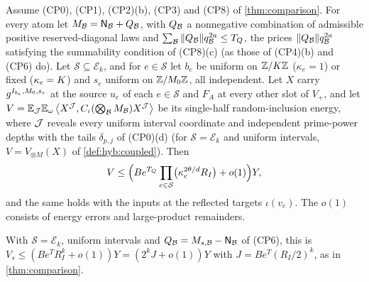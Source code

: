 \begin{lemma}\label{lem:envelope-energy}
Assume (CP0), (CP1), (CP2)(b), (CP3) and (CP8) of \cref{thm:comparison}. For
every atom let $M_\mathcal B=\mathsf N_\mathcal B+Q_\mathcal B$, with $Q_\mathcal B$ a nonnegative combination
of admissible positive reserved-diagonal laws and
$\sum_\mathcal B\|Q_\mathcal B\|q_\mathcal B^{2a}\le T_Q$, the prices $\|Q_\mathcal B\|q_\mathcal B^{2a}$
satisfying the summability condition of (CP8)(c) (as those of (CP4)(b) and
(CP6) do). Let $\mathcal S\subseteq\mathcal E_k$, and
for $e\in\mathcal S$ let $b_e$ be uniform on $\mathbb Z/K\mathbb Z$ ($\kappa_e=1$) or
fixed ($\kappa_e=K$) and $s_e$ uniform on $\mathbb Z/M_0\mathbb Z$, all independent.
Let $X$ carry $g^{I_{b_e},M_0,s_e}$ at the source $u_e$ of each
$e\in\mathcal S$ and $F_A$ at every other slot of $V_+$, and let
$V=\mathbb E_\mathcal J\mathbb E_\omega\left\langle X^\mathcal J,C_\iota(\bigotimes_\mathcal B M_\mathcal B)X^\mathcal J\right\rangle$ be its
single-half random-inclusion energy, where $\mathcal J$ reveals every uniform
interval coordinate and independent prime-power depths with the tails
$\delta_{p,j}$ of (CP0)(d) (for $\mathcal
S=\mathcal E_k$ and uniform intervals, $V=V_{\otimes M}(X)$ of
\cref{def:hyb:coupled}). Then
\[
 V\le\Bigl(Be^{T_Q}\prod_{e\in\mathcal S}\bigl(\kappa_e^{2\theta/d}R_I\bigr)
 +o(1)\Bigr)Y ,
\]
and the same holds with the inputs at the reflected targets $\iota(v_e)$. The
$o(1)$ consists of energy errors and large-product remainders.
\end{lemma}

With $\mathcal S=\mathcal E_k$, uniform intervals and $Q_\mathcal B=M_{s,\mathcal B}-\mathsf N_\mathcal B$
of (CP6), this is $V_s\le(Be^TR_I^k+o(1))Y=(2^kJ+o(1))Y$ with
$J=Be^T(R_I/2)^k$, as in \cref{thm:comparison}.


